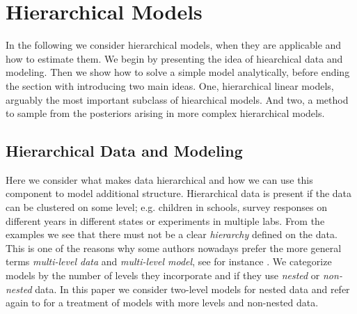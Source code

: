 \section{Hierarchical Models}
In the following we consider hierarchical models, when they are applicable and how to estimate them.
We begin by presenting the idea of hiearchical data and modeling.
Then we show how to solve a simple model analytically, before ending the section with introducing two main ideas.
One, hierarchical linear models, arguably the most important subclass of hiearchical models.
And two, a method to sample from the posteriors arising in more complex hierarchical models.

\subsection{Hierarchical Data and Modeling}

Here we consider what makes data hierarchical and how we can use this component to model additional structure.
Hierarchical data is present if the data can be clustered on some level; e.g. children in schools, survey responses on different years in different states or experiments in multiple labs.
From the examples we see that there must not be a clear \emph{hierarchy} defined on the data.
This is one of the reasons why some authors nowadays prefer the more general terms \emph{multi-level data} and \emph{multi-level model}, see for instance \citet{GelmanHill2007}.
We categorize models by the number of levels they incorporate and if they use \emph{nested} or \emph{non-nested} data.
In this paper we consider two-level models for nested data and refer again to \citet{GelmanHill2007} for a treatment of models with more levels and non-nested data.

